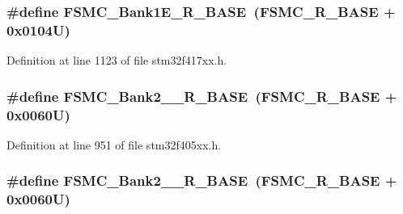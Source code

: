 \subsubsection[{\texorpdfstring{F\+S\+M\+C\+\_\+\+Bank1\+E\+\_\+\+R\+\_\+\+B\+A\+SE}{FSMC_Bank1E_R_BASE}}]{\setlength{\rightskip}{0pt plus 5cm}\#define F\+S\+M\+C\+\_\+\+Bank1\+E\+\_\+\+R\+\_\+\+B\+A\+SE~({\bf F\+S\+M\+C\+\_\+\+R\+\_\+\+B\+A\+SE} + 0x0104\+U)}\hypertarget{group___peripheral__registers__structures_gaea182589c84aee30b7f735474d8774e2}{}\label{group___peripheral__registers__structures_gaea182589c84aee30b7f735474d8774e2}


Definition at line 1123 of file stm32f417xx.\+h.

\subsubsection[{\texorpdfstring{F\+S\+M\+C\+\_\+\+Bank2\+\_\+3\+\_\+\+R\+\_\+\+B\+A\+SE}{FSMC_Bank2_3_R_BASE}}]{\setlength{\rightskip}{0pt plus 5cm}\#define F\+S\+M\+C\+\_\+\+Bank2\+\_\+\_\+\+R\+\_\+\+B\+A\+SE~({\bf F\+S\+M\+C\+\_\+\+R\+\_\+\+B\+A\+SE} + 0x0060\+U)}\hypertarget{group___peripheral__registers__structures_ga851707a200f63e03c336073706fdce1d}{}\label{group___peripheral__registers__structures_ga851707a200f63e03c336073706fdce1d}


Definition at line 951 of file stm32f405xx.\+h.

\subsubsection[{\texorpdfstring{F\+S\+M\+C\+\_\+\+Bank2\+\_\+3\+\_\+\+R\+\_\+\+B\+A\+SE}{FSMC_Bank2_3_R_BASE}}]{\setlength{\rightskip}{0pt plus 5cm}\#define F\+S\+M\+C\+\_\+\+Bank2\+\_\+\_\+\+R\+\_\+\+B\+A\+SE~({\bf F\+S\+M\+C\+\_\+\+R\+\_\+\+B\+A\+SE} + 0x0060\+U)}\hypertarget{group___peripheral__registers__structures_ga851707a200f63e03c336073706fdce1d}{}\label{group___peripheral__registers__structures_ga851707a200f63e03c336073706fdce1d}


